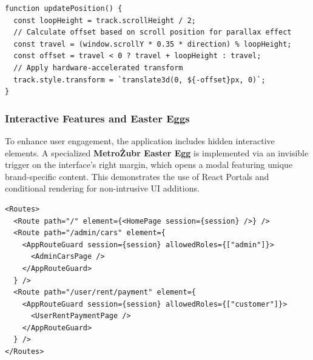 \begin{lstlisting}[style=pythonstyle, caption=High-Performance Scroll Animation Logic]
function updatePosition() {
  const loopHeight = track.scrollHeight / 2;
  // Calculate offset based on scroll position for parallax effect
  const travel = (window.scrollY * 0.35 * direction) % loopHeight;
  const offset = travel < 0 ? travel + loopHeight : travel;
  // Apply hardware-accelerated transform
  track.style.transform = `translate3d(0, ${-offset}px, 0)`;
}
\end{lstlisting}


\subsubsection{Interactive Features and Easter Eggs}
To enhance user engagement, the application includes hidden interactive elements. A specialized \textbf{MetroŻubr Easter Egg} is implemented via an invisible trigger on the interface's right margin, which opens a modal featuring unique brand-specific content. This demonstrates the use of React Portals and conditional rendering for non-intrusive UI additions.

\begin{lstlisting}[style=pythonstyle, caption=Snippet of App Routing and Guards]
<Routes>
  <Route path="/" element={<HomePage session={session} />} />
  <Route path="/admin/cars" element={
    <AppRouteGuard session={session} allowedRoles={["admin"]}>
      <AdminCarsPage />
    </AppRouteGuard>
  } />
  <Route path="/user/rent/payment" element={
    <AppRouteGuard session={session} allowedRoles={["customer"]}>
      <UserRentPaymentPage />
    </AppRouteGuard>
  } />
</Routes>
\end{lstlisting}